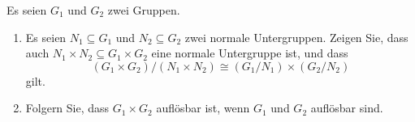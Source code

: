 \begin{question}[subtitle = Produkte von Normalteilern und auflösbaren Gruppen]
  Es seien $G_1$ und $G_2$ zwei Gruppen.
  \begin{enumerate}
    \item
      Es seien $N_1 \subseteq G_1$ und $N_2 \subseteq G_2$ zwei normale Untergruppen.
      Zeigen Sie, dass auch $N_1 \times N_2 \subseteq G_1 \times G_2$ eine normale Untergruppe ist, und dass
      \[
        (G_1 \times G_2)/(N_1 \times N_2) \cong (G_1/N_1) \times (G_2/N_2)
      \]
      gilt.
    \item
      Folgern Sie, dass $G_1 \times G_2$ auflösbar ist, wenn $G_1$ und $G_2$ auflösbar sind.
  \end{enumerate}
\end{question}


